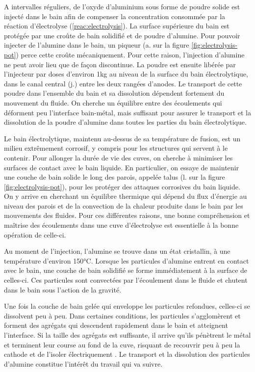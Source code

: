A intervalles réguliers, de l'oxyde d'aluminium sous forme de poudre
solide est injecté dans le bain afin de compenser la concentration
consommée par la réaction d'électrolyse (\ref{reac:electrolysis}).  La
surface supérieure du bain est protégée par une croûte de bain
solidifié et de poudre d'alumine. Pour pouvoir injecter de l'alumine
dans le bain, un piqueur (a. sur la figure \ref{fig:electrolysis-pot})
perce cette croûte mécaniquement. Pour cette raison, l'injection
d'alumine ne peut avoir lieu que de façon discontinue.  La poudre est
ensuite libérée par l'injecteur par doses d'environ
\num{1}\si{\kilo\gram} au niveau de la surface du bain électrolytique,
dans le canal central (j.) entre les deux rangées d'anodes. Le transport de
cette poudre dans l'ensemble du bain et sa dissolution dépendent
fortement du mouvement du fluide. On cherche un équilibre entre
des écoulements qui déforment peu l'interface bain-métal, mais
suffisant pour assurer le transport et la dissolution de la
poudre d'alumine dans toutes les parties du bain électrolytique.

Le bain électrolytique, maintenu au-dessus de sa température de
fusion, est un milieu extrêmement corrosif, y compris pour les
structures qui servent à le contenir. Pour allonger la durée de vie
des cuves, on cherche à minimiser les surfaces de contact avec le bain
liquide. En particulier, on essaye de maintenir une couche de bain
solide le long des parois, appelée talus (l. sur la figure \ref{fig:electrolysis-pot}), pour les protéger des
attaques corrosives du bain liquide. On y arrive en cherchant un
équilibre thermique qui dépend du flux d'énergie au niveau des parois
et de la convection de la chaleur produite dans le bain par les
mouvements des fluides. Pour ces différentes raisons, une bonne
compréhension et maîtrise des écoulements dans une cuve d'électrolyse
est essentielle à la bonne opération de celle-ci.

Au moment de l'injection, l'alumine se trouve dans un état cristallin,
à une température d'environ \num{150}\si{\celsius}. Lorsque les
particules d'alumine entrent en contact avec le bain, une couche de
bain solidifié se forme immédiatement à la surface de celles-ci. Ces particules
sont convectées par l'écoulement dans le fluide et chutent dans le bain
sous l'action de la gravité.

Une fois la couche de bain gelée qui enveloppe les particules
refondues, celles-ci se dissolvent peu à peu. Dans certaines
conditions, les particules s'agglomèrent et forment des agrégats
qui descendent rapidement dans le bain et atteignent l'interface. Si
la taille des agrégats est suffisante, il arrive qu'ils pénètrent
le métal et terminent leur course au fond de la cuve, risquant de
recouvrir peu à peu la cathode et de l'isoler électriquement
\cite{Geay2016}. Le transport et la dissolution des particules
d'alumine constitue l'intérêt du travail qui va suivre.

